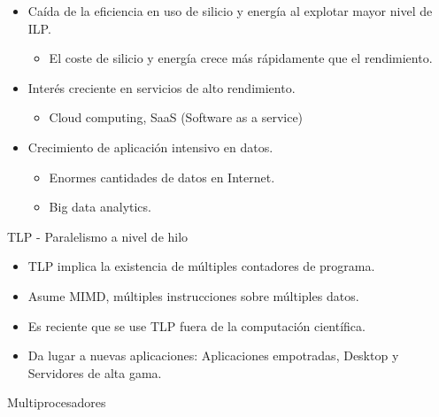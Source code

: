 \documentclass[12pt, twoside, openright]{report} %
\begin{document}
    \begin{itemize}
    
    \item
      Caída de la eficiencia en uso de silicio y energía al explotar
      mayor nivel de ILP.

      \begin{itemize}
      
      \item
        El coste de silicio y energía crece más rápidamente que el
        rendimiento.
      \end{itemize}
    \item
      Interés creciente en servicios de alto rendimiento.

      \begin{itemize}
      
      \item
        Cloud computing, SaaS (Software as a service)
      \end{itemize}
    \item
      Crecimiento de aplicación intensivo en datos.

      \begin{itemize}
      
      \item
        Enormes cantidades de datos en Internet.
      \item
        Big data analytics.
      \end{itemize}
    \end{itemize}

    TLP - Paralelismo a nivel de hilo
    \vspace{-0.5cm}

    \begin{itemize}
    
    \item
      TLP implica la existencia de múltiples contadores de programa.
    \item
      Asume MIMD, múltiples instrucciones sobre múltiples datos.
    \item
      Es reciente que se use TLP fuera de la computación científica.
    \item
      Da lugar a nuevas aplicaciones: Aplicaciones empotradas, Desktop
      y Servidores de alta gama.
    \end{itemize}

    Multiprocesadores
    \vspace{-0.5cm}
\end{document}
